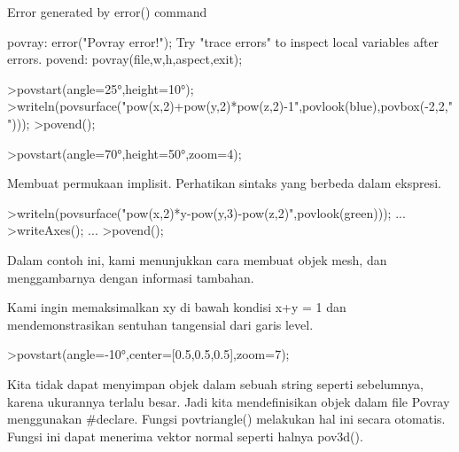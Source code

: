\documentclass{article}
\begin{document}
\begin{eulernotebook}
\begin{eulercomment}
\begin{eulercomment}
\begin{euleroutput}
  Error generated by error() command
  
  povray:
      error("Povray error!");
  Try "trace errors" to inspect local variables after errors.
  povend:
      povray(file,w,h,aspect,exit); 
\end{euleroutput}
\begin{eulerprompt}
>povstart(angle=25°,height=10°); 
>writeln(povsurface("pow(x,2)+pow(y,2)*pow(z,2)-1",povlook(blue),povbox(-2,2,"")));
>povend();
\end{eulerprompt}
\begin{eulerprompt}
>povstart(angle=70°,height=50°,zoom=4);
\end{eulerprompt}
\begin{eulercomment}
Membuat permukaan implisit. Perhatikan sintaks yang berbeda dalam
ekspresi.
\end{eulercomment}
\begin{eulerprompt}
>writeln(povsurface("pow(x,2)*y-pow(y,3)-pow(z,2)",povlook(green))); ...
>writeAxes(); ...
>povend();
\end{eulerprompt}
\begin{eulercomment}
Dalam contoh ini, kami menunjukkan cara membuat objek mesh, dan
menggambarnya dengan informasi tambahan.

Kami ingin memaksimalkan xy di bawah kondisi x+y = 1 dan
mendemonstrasikan sentuhan tangensial dari garis level.
\end{eulercomment}
\begin{eulerprompt}
>povstart(angle=-10°,center=[0.5,0.5,0.5],zoom=7);
\end{eulerprompt}
\begin{eulercomment}
Kita tidak dapat menyimpan objek dalam sebuah string seperti
sebelumnya, karena ukurannya terlalu besar. Jadi kita mendefinisikan
objek dalam file Povray menggunakan #declare. Fungsi povtriangle()
melakukan hal ini secara otomatis. Fungsi ini dapat menerima vektor
normal seperti halnya pov3d().


\end{eulercomment}
\end{eulercomment}
\end{eulercomment}
\end{eulernotebook}
\end{document}
